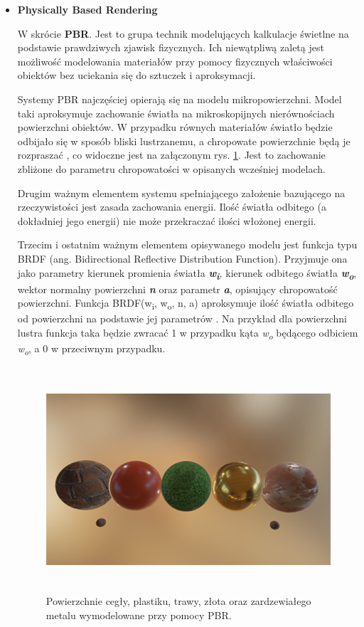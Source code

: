 \begin{itemize}
	\item \textbf{Physically Based Rendering}
	
	W skrócie \textbf{PBR}. Jest to grupa technik modelujących kalkulacje świetlne na podstawie prawdziwych zjawisk fizycznych. Ich niewątpliwą zaletą jest możliwość modelowania materiałów przy pomocy fizycznych właściwości obiektów bez uciekania się do sztuczek i aproksymacji.
	
	Systemy PBR najczęściej opierają się na modelu mikropowierzchni. Model taki aproksymuje zachowanie światła na mikroskopijnych nierównościach powierzchni obiektów. W przypadku równych materiałów światło będzie odbijało się w sposób bliski lustrzanemu, a chropowate powierzchnie będą je rozpraszać \cite{learnopengl:pbr:2024}, co widoczne jest na załączonym rys. \ref{intro-PBR}. Jest to zachowanie zbliżone do parametru chropowatości w opisanych wcześniej modelach.

	Drugim ważnym elementem systemu spełniającego założenie bazującego na rzeczywistości jest zasada zachowania energii. Ilość światła odbitego (a dokładniej jego energii) nie może przekraczać ilości włożonej energii. \cite{learnopengl:pbr:2024}

	Trzecim i ostatnim ważnym elementem opisywanego modelu jest funkcja typu BRDF (ang. Bidirectional Reflective Distribution Function). Przyjmuje ona jako parametry kierunek promienia światła \emph{\textbf{w\textsubscript{i}},} kierunek odbitego światła \emph{\textbf{w\textsubscript{o}}}, wektor normalny powierzchni \emph{\textbf{n}} oraz parametr \emph{\textbf{a}}, opisujący chropowatość powierzchni. Funkcja BRDF(w\textsubscript{i}, w\textsubscript{o}, n, a) aproksymuje ilość światła odbitego od powierzchni na podstawie jej parametrów \cite{learnopengl:pbr:2024}. Na przykład dla powierzchni lustra funkcja taka będzie zwracać 1 w przypadku kąta \emph{w\textsubscript{o}} będącego odbiciem \emph{w\textsubscript{o}}, a 0 w przeciwnym przypadku.
	
	\begin{figure}[htbp]
		\centering
		\includegraphics[width=5.425in,height=3.2752in]{images/8_pbr_surfaces.png}
		\caption{Powierzchnie cegły, plastiku, trawy, złota oraz zardzewiałego metalu wymodelowane przy pomocy PBR. \cite{learnopengl:pbr:2024}}
		\label{intro-PBR}
	\end{figure}
\end{itemize}

